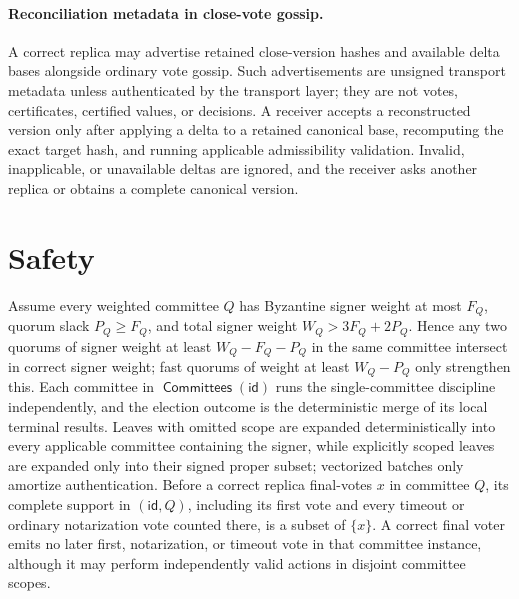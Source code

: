 \documentclass[sigplan,twocolumn,review,anonymous]{acmart}
\newcommand{\func}[1]{\operatorname{\mathsf{#1}}}
\newcommand{\id}{\mathsf{id}}
\newcommand{\Committees}{\func{Committees}}
\begin{document}
\paragraph{Reconciliation metadata in close-vote gossip.}
A correct replica may advertise retained close-version hashes and available delta bases alongside ordinary
vote gossip.  Such advertisements are unsigned transport metadata unless authenticated by the transport
layer; they are not votes, certificates, certified values, or decisions.  A receiver accepts a
reconstructed version only after applying a delta to a retained canonical base, recomputing the exact
target hash, and running applicable admissibility validation.  Invalid, inapplicable, or unavailable deltas
are ignored, and the receiver asks another replica or obtains a complete canonical version.

\section{Safety}

Assume every weighted committee \(Q\) has Byzantine signer weight at most \(F_Q\), quorum slack
\(P_Q\ge F_Q\), and total signer weight \(W_Q>3F_Q+2P_Q\).  Hence any two quorums of signer weight
at least \(W_Q-F_Q-P_Q\) in the same committee intersect in correct signer weight; fast quorums of
weight at least \(W_Q-P_Q\) only strengthen this.  Each committee in \(\Committees(\id)\) runs the
single-committee discipline independently, and the election outcome is the deterministic merge of its
local terminal results.  Leaves with omitted scope are expanded deterministically into every applicable
committee containing the signer, while explicitly scoped leaves are expanded only into their signed
proper subset; vectorized batches only amortize authentication.  Before a correct replica final-votes
\(x\) in committee \(Q\), its complete support in \((\id,Q)\), including its first vote and every
timeout or ordinary notarization vote counted there, is a subset of \(\{x\}\).  A correct final voter
emits no later first, notarization, or timeout vote in that committee instance, although it may perform
independently valid actions in disjoint committee scopes.
\end{document}
